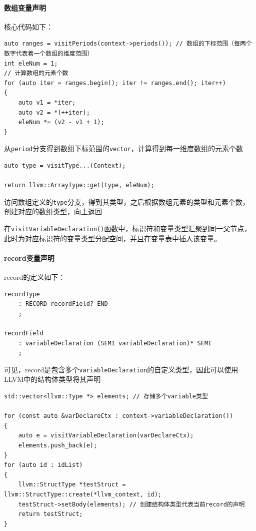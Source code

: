 \documentclass[lang=cn,11pt,a4paper,cite=authornum]{paper}
\begin{document}
\paragraph{数组变量声明} 核心代码如下：

\begin{code}
\begin{verbatim}
auto ranges = visitPeriods(context->periods()); // 数组的下标范围（每两个数字代表着一个数组的维度范围）
int eleNum = 1;
// 计算数组的元素个数
for (auto iter = ranges.begin(); iter != ranges.end(); iter++)
{
    auto v1 = *iter;
    auto v2 = *(++iter);
    eleNum *= (v2 - v1 + 1);
}
\end{verbatim}
\end{code}

从\texttt{period}分支得到数组下标范围的\texttt{vector}，计算得到每一维度数组的元素个数

\begin{code}
\begin{verbatim}
auto type = visitType...(Context);

return llvm::ArrayType::get(type, eleNum);
\end{verbatim}
\end{code}

访问数组定义的\texttt{type}分支，得到其类型，之后根据数组元素的类型和元素个数，创建对应的数组类型，向上返回

在\texttt{visitVariableDeclaration()}函数中，标识符和变量类型汇聚到同一父节点，此时为对应标识符的变量类型分配空间，并且在变量表中插入该变量。

\paragraph{record变量声明} record的定义如下：

\begin{code}
\begin{verbatim}
recordType
    : RECORD recordField? END
    ;

recordField
    : variableDeclaration (SEMI variableDeclaration)* SEMI
    ;
\end{verbatim}
\end{code}

可见，record是包含多个\texttt{variableDeclaration}的自定义类型，因此可以使用LLVM中的结构体类型将其声明

\begin{code}
\begin{verbatim}
std::vector<llvm::Type *> elements; // 存储多个variable类型

for (const auto &varDeclareCtx : context->variableDeclaration())
{
    auto e = visitVariableDeclaration(varDeclareCtx);
    elements.push_back(e);
}
for (auto id : idList)
{
    llvm::StructType *testStruct = llvm::StructType::create(*llvm_context, id);
    testStruct->setBody(elements); // 创建结构体类型代表当前record的声明
    return testStruct;
}
\end{verbatim}
\end{code}
\end{document}
